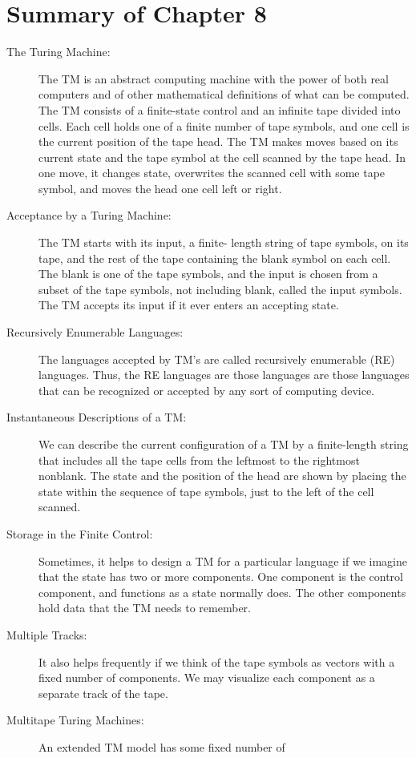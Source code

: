 \documentclass[]{article}
\begin{document}
\section*{Summary of Chapter 8}
\begin{description}
\item[The Turing Machine:] The TM is an abstract computing machine with the
power of both real computers and of other mathematical definitions of what can
be computed. The TM consists of a finite-state control and an infinite tape
divided into cells. Each cell holds one of a finite number of tape symbols, and
one cell is the current position of the tape head. The TM makes moves based on
its current state and the tape symbol at the cell scanned by the tape head. In
one move, it changes state, overwrites the scanned cell with some tape symbol,
and moves the head one cell left or right.
\item[Acceptance by a Turing Machine:] The TM starts with its input, a finite-
length string of tape symbols, on its tape, and the rest of the tape containing
the blank symbol on each cell. The blank is one of the tape symbols, and the
input is chosen from a subset of the tape symbols, not including blank, called
the input symbols. The TM accepts its input if it ever enters an accepting
state.
\item[Recursively Enumerable Languages:] The languages accepted by TM's are
called recursively enumerable (RE) languages. Thus, the RE languages are those
languages are those languages that can be recognized or accepted by any sort of
computing device.
\item[Instantaneous Descriptions of a TM:] We can describe the current
configuration of a TM by a finite-length string that includes all the tape cells
from the leftmost to the rightmost nonblank. The state and the position of the
head are shown by placing the state within the sequence of tape symbols, just to
the left of the cell scanned.
\item[Storage in the Finite Control:] Sometimes, it helps to design a TM for a
particular language if we imagine that the state has two or more components. One
component is the control component, and functions as a state normally does. The
other components hold data that the TM needs to remember.
\item[Multiple Tracks:] It also helps frequently if we think of the tape symbols
as vectors with a fixed number of components. We may visualize each component as
a separate track of the tape.
\item[Multitape Turing Machines:] An extended TM model has some fixed number of

\end{description}
\end{document}
